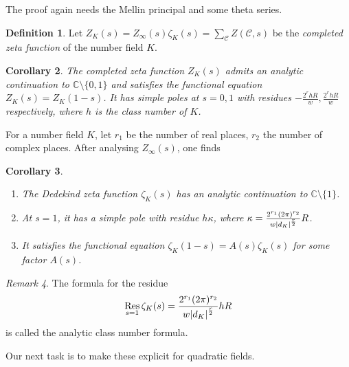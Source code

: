 \documentclass[11pt]{article}
\theoremstyle{definition}
\newtheorem{definition}{Definition}[section]
\theoremstyle{plain}
\newtheorem{corollary}[definition]{Corollary}
\theoremstyle{remark}
\newtheorem{remark}[definition]{Remark}
\DeclareMathOperator{\Res}{Res}
\newcommand{\CC}{\mathbb{C}}
\newcommand{\cC}{\mathcal{C}}
\begin{document}
The proof again needs the Mellin principal and some theta series.

\begin{definition}\label{def:6_4}
    Let $Z_K(s) = Z_\infty(s) \zeta_K(s) = \sum_{\cC} Z(\cC, s)$ be the \emph{completed zeta function} of the number field $K$.
\end{definition}

\begin{corollary}\label{cor:6_5}
    The completed zeta function $Z_K(s)$ admits an analytic continuation to $\CC \setminus \{0, 1\}$ and satisfies the functional equation $Z_K(s) = Z_K(1-s)$. It has simple poles at $s=0,1$ with residues $-\frac{2^r h R}{w}, \frac{2^r h R}{w}$ respectively, where $h$ is the class number of $K$.
\end{corollary}

For a number field $K$, let $r_1$ be the number of real places, $r_2$ the number of complex places. After analysing $Z_\infty(s)$, one finds
\begin{corollary}\label{cor:6_6}\phantom{}
    \begin{enumerate}
        \item The Dedekind zeta function $\zeta_K(s)$ has an analytic continuation to $\CC \setminus \{1\}$.
        \item At $s=1$, it has a simple pole with residue $h \kappa$, where $\kappa = \frac{2^{r_1} (2\pi)^{r_2}}{w \, \abs{d_K}^{\frac{r}{2}}} R$.
        \item It satisfies the functional equation $\zeta_K(1-s) = A(s) \zeta_K(s)$ for some factor $A(s)$.
    \end{enumerate}
\end{corollary}

\begin{remark}\label{rem:6_7}
    The formula for the residue
    \begin{equation*}
        \Res_{s=1} \zeta_K(s) = \frac{2^{r_1} (2 \pi)^{r_2}}{w \abs{d_K}^{\frac{r}{2}}} h R
    \end{equation*}
    is called the analytic class number formula.
\end{remark}

\noindent Our next task is to make these explicit for quadratic fields.
\end{document}
